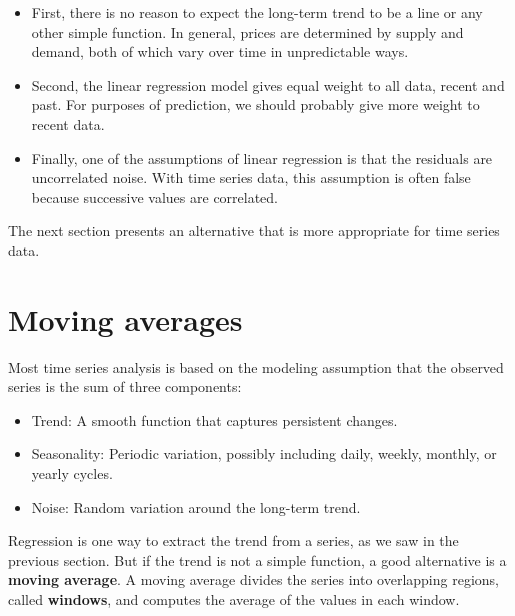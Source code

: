 \documentclass[12pt]{book}
\begin{document}
\begin{itemize}

\item First, there is no reason to expect the long-term trend to be a
  line or any other simple function.  In general, prices are
  determined by supply and demand, both of which vary over time in
  unpredictable ways.

\item Second, the linear regression model gives equal weight to all
  data, recent and past.  For purposes of prediction, we should
  probably give more weight to recent data.

\item Finally, one of the assumptions of linear regression is that the
  residuals are uncorrelated noise.  With time series data, this
  assumption is often false because successive values are correlated.

\end{itemize}

The next section presents an alternative that is more appropriate
for time series data.


\section{Moving averages}

Most time series analysis is based on the modeling assumption that the
observed series is the sum of three components:

\begin{itemize}

\item Trend: A smooth function that captures persistent changes.

\item Seasonality: Periodic variation, possibly including daily,
weekly, monthly, or yearly cycles.

\item Noise: Random variation around the long-term trend.

\end{itemize}

Regression is one way to extract the trend from a series, as we
saw in the previous section.  But if the trend is not a simple
function, a good alternative is a {\bf moving average}.  A moving
average divides the series into overlapping regions, called {\bf windows},
and computes the average of the values in each window.
\end{document}
